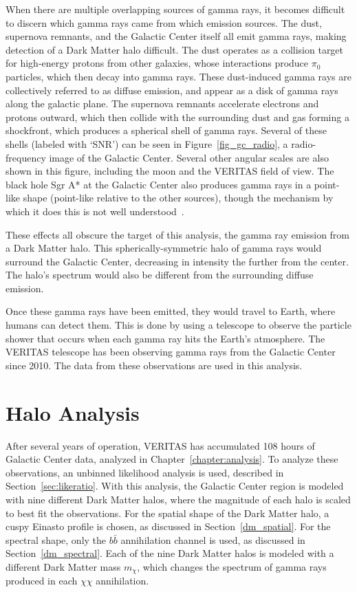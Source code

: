   When there are multiple overlapping sources of gamma rays, it becomes difficult to discern which gamma rays came from which emission sources.
  The dust, supernova remnants, and the Galactic Center itself all emit gamma rays, making detection of a Dark Matter halo difficult.
  The dust operates as a collision target for high-energy protons from other galaxies, whose interactions produce $\pi_0$ particles, which then decay into gamma rays.
  These dust-induced gamma rays are collectively referred to as diffuse emission, and appear as a disk of gamma rays along the galactic plane.
  The supernova remnants accelerate electrons and protons outward, which then collide with the surrounding dust and gas forming a shockfront, which produces a spherical shell of gamma rays.
  Several of these shells (labeled with `SNR') can be seen in Figure~\ref{fig_gc_radio}, a radio-frequency image of the Galactic Center.
  Several other angular scales are also shown in this figure, including the moon and the VERITAS field of view.
  The black hole Sgr A* at the Galactic Center also produces gamma rays in a point-like shape (point-like relative to the other sources), though the mechanism by which it does this is not well understood~\cite{gal_cent_still_undetermined}.

  These effects all obscure the target of this analysis, the gamma ray emission from a Dark Matter halo.
  This spherically-symmetric halo of gamma rays would surround the Galactic Center, decreasing in intensity the further from the center.
  The halo's spectrum would also be different from the surrounding diffuse emission.

  Once these gamma rays have been emitted, they would travel to Earth, where humans can detect them.
  This is done by using a telescope to observe the particle shower that occurs when each gamma ray hits the Earth's atmosphere.
  The VERITAS telescope has been observing gamma rays from the Galactic Center since 2010.
  The data from these observations are used in this analysis.


\section{Halo Analysis}
  After several years of operation, VERITAS has accumulated 108 hours of Galactic Center data, analyzed in Chapter~\ref{chapter:analysis}.
  To analyze these observations, an unbinned likelihood analysis is used, described in Section~\ref{sec:likeratio}.
  With this analysis, the Galactic Center region is modeled with nine different Dark Matter halos, where the magnitude of each halo is scaled to best fit the observations.
  For the spatial shape of the Dark Matter halo, a cuspy Einasto profile is chosen, as discussed in Section~\ref{dm_spatial}.
  For the spectral shape, only the $b\bar{b}$ annihilation channel is used, as discussed in Section~\ref{dm_spectral}.
  Each of the nine Dark Matter halos is modeled with a different Dark Matter mass $m_{\chi}$, which changes the spectrum of gamma rays produced in each $\chi\chi$ annihilation.
  

